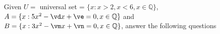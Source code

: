 

\EXPR[0]\vd{\vb + (\va*\vc)}
\MULTIPLY\va\vb\ve
\EXPR[0]\vm{\vg + (\vh*\va)}
\MULTIPLY\va\vg\vn

\question Given $U=$ universal set = $\lbrace x : x > 2, x < 6, x\in\mathbb{Q}\rbrace$, 
$A=\lbrace x : \vc x^2 - \vd x + \ve = 0, x \in \mathbb{Q} \rbrace$ 
and $B=\lbrace x : \vh x^2 - \vm x + \vn = 0, x\in\mathbb{Q} \rbrace$, answer the following questions

\watchout

